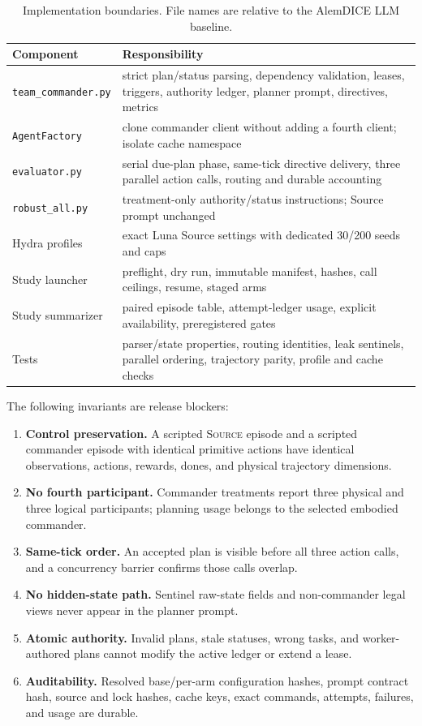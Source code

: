 \documentclass[11pt]{article}
\newcommand{\sourcearm}{\textsc{Source}}
\newcommand{\code}[1]{\texttt{#1}}
\begin{document}
\begin{table}[h]
\centering\small
\begin{tabularx}{\textwidth}{lX}
\toprule
Component & Responsibility\\
\midrule
\code{team\_commander.py} & strict plan/status parsing, dependency validation, leases, triggers, authority ledger, planner prompt, directives, metrics\\
\code{AgentFactory} & clone commander client without adding a fourth client; isolate cache namespace\\
\code{evaluator.py} & serial due-plan phase, same-tick directive delivery, three parallel action calls, routing and durable accounting\\
\code{robust\_all.py} & treatment-only authority/status instructions; Source prompt unchanged\\
Hydra profiles & exact Luna Source settings with dedicated 30/200 seeds and caps\\
Study launcher & preflight, dry run, immutable manifest, hashes, call ceilings, resume, staged arms\\
Study summarizer & paired episode table, attempt-ledger usage, explicit availability, preregistered gates\\
Tests & parser/state properties, routing identities, leak sentinels, parallel ordering, trajectory parity, profile and cache checks\\
\bottomrule
\end{tabularx}
\caption{Implementation boundaries.  File names are relative to the AlemDICE LLM baseline.}
\end{table}

The following invariants are release blockers:
\begin{enumerate}
  \item \textbf{Control preservation.} A scripted \sourcearm{} episode and a
  scripted commander episode with identical primitive actions have identical
  observations, actions, rewards, dones, and physical trajectory dimensions.
  \item \textbf{No fourth participant.} Commander treatments report three
  physical and three logical participants; planning usage belongs to the selected
  embodied commander.
  \item \textbf{Same-tick order.} An accepted plan is visible before all three
  action calls, and a concurrency barrier confirms those calls overlap.
  \item \textbf{No hidden-state path.} Sentinel raw-state fields and non-commander
  legal views never appear in the planner prompt.
  \item \textbf{Atomic authority.} Invalid plans, stale statuses, wrong tasks, and
  worker-authored plans cannot modify the active ledger or extend a lease.
  \item \textbf{Auditability.} Resolved base/per-arm configuration hashes, prompt
  contract hash, source and lock hashes, cache keys, exact commands, attempts,
  failures, and usage are durable.
\end{enumerate}
\end{document}
